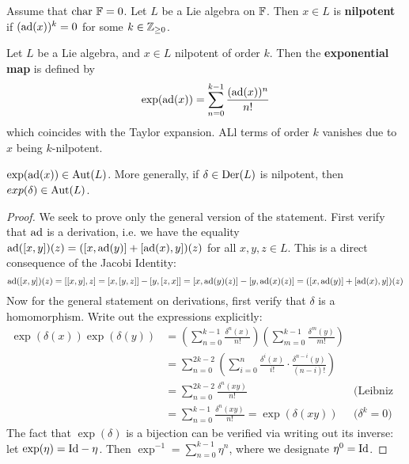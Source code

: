 \documentclass{article}
\begin{document}
\begin{definition}
    Assume that $\mathrm{char}\ {\mathbb{F}} = 0$. Let $L$ be a Lie algebra on $\mathbb{F}$. Then $x \in L$ is \textbf{nilpotent} if $(\operatorname{ad}(x))^k = 0$ for some $k \in \mathbb{Z}_{\geq 0}$.
\end{definition}

\begin{definition}
    Let $L$ be a Lie algebra, and $x \in L$ nilpotent of order $k$. Then the \textbf{exponential map} is defined by
    \[
        \exp(\operatorname{ad}(x)) = \sum_{n = 0}^{k-1} \frac{(\operatorname{ad}(x))^n}{n!}
    \] 
    which coincides with the Taylor expansion. ALl terms of order $k$ vanishes due to $x$ being $k$-nilpotent.
\end{definition}

\begin{lemma}
    $\exp(\operatorname{ad}(x)) \in \mathrm{Aut}(L)$. More generally, if $\delta \in \operatorname{Der}(L)$ is nilpotent, then $exp(\delta) \in \mathrm{Aut}(L)$.
\end{lemma}

\begin{proof}
    We seek to prove only the general version of the statement. First verify that $\operatorname{ad}$ is a derivation, i.e. we have the equality $\operatorname{ad}([x, y])(z) = ([x, \operatorname{ad}(y)] + [\operatorname{ad}(x), y])(z)$ for all $x, y, z \in L$. This is a direct consequence of the Jacobi Identity:
    \[
        \operatorname{ad}([x, y])(z) = [[x, y], z] = [x, [y, z]] - [y, [z, x]] = [x, \operatorname{ad}(y)(z)] - [y, \operatorname{ad}(x)(z)] = ([x, \operatorname{ad}(y)] + [\operatorname{ad}(x), y])(z)
    \]
    Now for the general statement on derivations, first verify that $\delta$ is a homomorphism. Write out the expressions explicitly:
    \begin{align*}
        \exp(\delta(x)) \exp(\delta(y))
        & = \left( \sum_{n = 0}^{k-1} \frac{\delta^n(x)}{n!} \right) \left( \sum_{m = 0}^{k-1} \frac{\delta^m(y)}{m!} \right) \\
        & = \sum_{n = 0}^{2k-2} \left( \sum_{i = 0}^n \frac{\delta^i(x)}{i!} \cdot \frac{\delta^{n-i}(y)}{(n-i)!} \right) \\
        & = \sum_{n = 0}^{2k-2} \frac{\delta^n(xy)}{n!} & \text{(Leibniz Rule)} \\
        & = \sum_{n = 0}^{k-1} \frac{\delta^n(xy)}{n!} = \exp(\delta(xy)) & \text{($\delta^k = 0$)}
    \end{align*}
    The fact that $\exp(\delta)$ is a bijection can be verified via writing out its inverse: let $\exp(\eta) = \mathrm{Id} - \eta$. Then $\exp^{-1} = \sum_{n=0}^{k-1} \eta^n$, where we designate $\eta^0 = \mathrm{Id}$. 
\end{proof}
\end{document}
